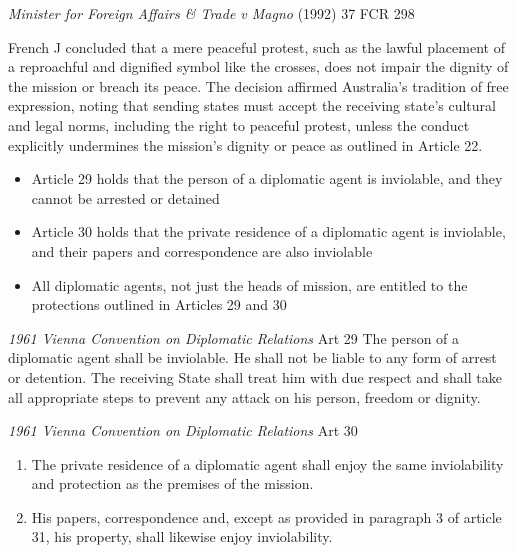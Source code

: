\begin{casedetails}{\textit{Minister for Foreign Affairs \& Trade v Magno} (1992) 37 FCR 298}
    \vspace{\baselineskip}

    French J concluded that a mere peaceful protest, such as the lawful placement of a reproachful and dignified symbol like the crosses, does not impair the dignity of the mission or breach its peace. The decision affirmed Australia's tradition of free expression, noting that sending states must accept the receiving state's cultural and legal norms, including the right to peaceful protest, unless the conduct explicitly undermines the mission's dignity or peace as outlined in Article 22.
\end{casedetails}

\begin{itemize}
    \item Article 29 holds that the person of a diplomatic agent is inviolable, and they cannot be arrested or detained
    \item Article 30 holds that the private residence of a diplomatic agent is inviolable, and their papers and correspondence are also inviolable
    \item All diplomatic agents, not just the heads of mission, are entitled to the protections outlined in Articles 29 and 30
\end{itemize}

\begin{conventiondetails}{\textit{1961 Vienna Convention on Diplomatic Relations} Art 29}
    \flushleft
    The person of a diplomatic agent shall be inviolable. He shall not be liable to any form of arrest or detention. The receiving State shall treat him with due respect and shall take all appropriate steps to prevent any attack on his person, freedom or dignity.
\end{conventiondetails}

\begin{conventiondetails}{\textit{1961 Vienna Convention on Diplomatic Relations} Art 30}
    \flushleft
    \begin{enumerate}
        \item The private residence of a diplomatic agent shall enjoy the same inviolability and protection as the premises of the mission.
        \item His papers, correspondence and, except as provided in paragraph 3 of article 31, his property, shall likewise enjoy inviolability.
    \end{enumerate}
\end{conventiondetails}

